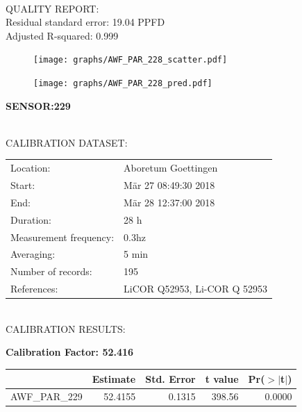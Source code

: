 \documentclass[oneside]{report}
\begin{document}
\hrulefill\\
QUALITY REPORT:\\
Residual standard error: 19.04 PPFD\\
Adjusted R-squared: 0.999



\begin{figure}[H]
  \centering
  \texttt{[image: graphs/AWF\_PAR\_228\_scatter.pdf]}
\end{figure}




\begin{figure}[H]
  \centering
  \texttt{[image: graphs/AWF\_PAR\_228\_pred.pdf]}
\end{figure}

\pagebreak


\begin{center}
\large{\textbf{SENSOR:229}}\\
\end{center}

\hrulefill\\
CALIBRATION DATASET:\\
\begin{table}[h!]
  \centering
  \label{tab:table1}
  \begin{tabular}{ll}
    Location: & Aboretum Goettingen\\ 
    
    
    Start:  & Mär 27 08:49:30 2018 \\
    End:   & Mär 28 12:37:00 2018\\ 
    Duration: & 28 h\\
    Measurement frequency: & 0.3hz\\
    Averaging:  &5 min\\
    Number of records: & 195 \\
    References: & LiCOR Q52953, Li-COR Q 52953 \\
  \end{tabular}
\end{table}

\hrulefill\\
CALIBRATION RESULTS:\\


\begin{center}
\textbf{\large{Calibration Factor: 52.416}}\\
\end{center}
\begin{table}[ht]
\centering
\begin{tabular}{rrrrr}
  \hline
 & Estimate & Std. Error & t value & Pr($>$$|$t$|$) \\ 
  \hline
AWF\_PAR\_229 & 52.4155 & 0.1315 & 398.56 & 0.0000 \\ 
   \hline
\end{tabular}
\end{table}
\end{document}
